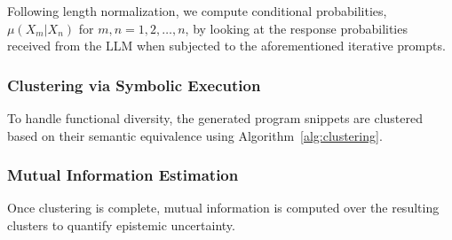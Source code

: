 Following length normalization, we compute conditional probabilities,  $\mu(X_m|X_n)$ for \(m,n = 1, 2, \ldots, n\), by looking at the response probabilities received from the LLM when subjected to the aforementioned iterative prompts.



\subsubsection{Clustering via Symbolic Execution}
To handle functional diversity, the generated program snippets are clustered based on their semantic equivalence using Algorithm~\ref{alg:clustering}. 


\subsubsection{Mutual Information Estimation}


Once clustering is complete, mutual information is computed over the resulting clusters to quantify epistemic uncertainty. 

